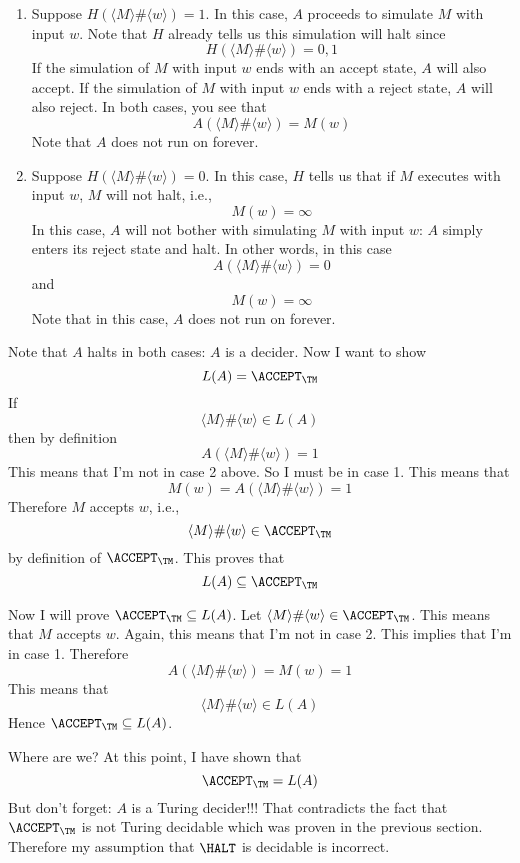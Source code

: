 \begin{enumerate}

\item Suppose $H(\langle M \rangle \# \langle w \rangle) = 1$.
In this case, 
$A$ proceeds to simulate $M$ with input $w$.
Note that $H$ already tells us this simulation will halt since
\[
H(\langle M \rangle \# \langle w \rangle) = 0, 1
\]
If the simulation of $M$ with input $w$ ends with an accept state, 
$A$ will also accept.
If the simulation of $M$ with input $w$ ends with a reject state, 
$A$ will also reject.
In both cases, you see that
\[
A(\langle M \rangle \# \langle w \rangle) = M(w)
\]
Note that $A$ does not run on forever.

\item Suppose $H(\langle M \rangle \# \langle w \rangle) = 0$.
In this case, $H$ tells us that 
if $M$ executes with input $w$, $M$ will not halt, i.e.,
\[
M(w) = \infty
\]
In this case, $A$ will not bother with simulating $M$ with input $w$:
$A$ simply enters its reject state and halt.
In other words, in this case
\[
A(\langle M \rangle \# \langle w \rangle) = 0
\]
and 
\[
M(w) = \infty
\]
Note that in this case, $A$ does not run on forever.
\end{enumerate}

Note that $A$ halts in both cases: $A$ is a decider.
Now I want to show
\[
L(A) = \ACCEPT_\TM
\]
If 
\[
\langle M \rangle \# \langle w \rangle \in L(A)
\]
then by definition
\[
A(\langle M \rangle \# \langle w \rangle) = 1
\]
This means that I'm not in case 2 above.
So I must be in case 1.
This means that 
\[
M(w) = A(\langle M \rangle \# \langle w \rangle) = 1
\]
Therefore $M$ accepts $w$, i.e.,
\[
\langle M \rangle \# \langle w \rangle \in \ACCEPT_\TM
\]
by definition of $\ACCEPT_\TM$.
This proves that
\[
L(A) \subseteq \ACCEPT_\TM
\]

Now I will prove 
$\ACCEPT_\TM \subseteq L(A)$.
Let 
$\langle M \rangle \# \langle w \rangle \in \ACCEPT_\TM$.
This means that $M$ accepts $w$.
Again, this means that I'm not in case 2.
This implies that I'm in case 1.
Therefore
\[
A(\langle M \rangle \# \langle w \rangle) = M(w) = 1
\]
This means that
\[
\langle M \rangle \# \langle w \rangle \in L(A)
\]
Hence $\ACCEPT_\TM \subseteq L(A)$.

Where are we?
At this point, I have shown that
\[
\ACCEPT_\TM = L(A)
\]
But don't forget: $A$ is a Turing decider!!!
That contradicts the fact that $\ACCEPT_\TM$ is not Turing decidable
which was proven in the previous section.
Therefore my assumption that $\HALT$ is decidable is incorrect.

